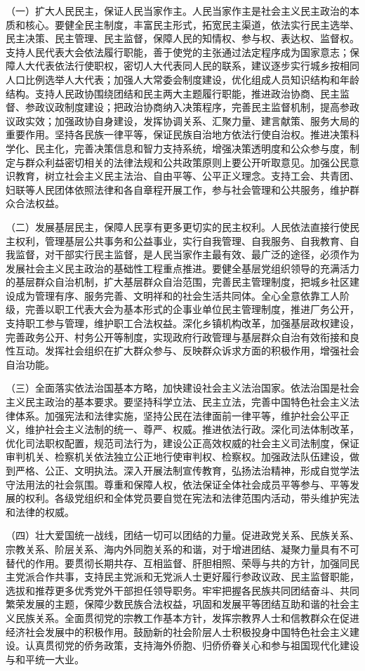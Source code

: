 （一）扩大人民民主，保证人民当家作主。人民当家作主是社会主义民主政治的本质和核心。要健全民主制度，丰富民主形式，拓宽民主渠道，依法实行民主选举、民主决策、民主管理、民主监督，保障人民的知情权、参与权、表达权、监督权。支持人民代表大会依法履行职能，善于使党的主张通过法定程序成为国家意志；保障人大代表依法行使职权，密切人大代表同人民的联系，建议逐步实行城乡按相同人口比例选举人大代表；加强人大常委会制度建设，优化组成人员知识结构和年龄结构。支持人民政协围绕团结和民主两大主题履行职能，推进政治协商、民主监督、参政议政制度建设；把政治协商纳入决策程序，完善民主监督机制，提高参政议政实效；加强政协自身建设，发挥协调关系、汇聚力量、建言献策、服务大局的重要作用。坚持各民族一律平等，保证民族自治地方依法行使自治权。推进决策科学化、民主化，完善决策信息和智力支持系统，增强决策透明度和公众参与度，制定与群众利益密切相关的法律法规和公共政策原则上要公开听取意见。加强公民意识教育，树立社会主义民主法治、自由平等、公平正义理念。支持工会、共青团、妇联等人民团体依照法律和各自章程开展工作，参与社会管理和公共服务，维护群众合法权益。

（二）发展基层民主，保障人民享有更多更切实的民主权利。人民依法直接行使民主权利，管理基层公共事务和公益事业，实行自我管理、自我服务、自我教育、自我监督，对干部实行民主监督，是人民当家作主最有效、最广泛的途径，必须作为发展社会主义民主政治的基础性工程重点推进。要健全基层党组织领导的充满活力的基层群众自治机制，扩大基层群众自治范围，完善民主管理制度，把城乡社区建设成为管理有序、服务完善、文明祥和的社会生活共同体。全心全意依靠工人阶级，完善以职工代表大会为基本形式的企事业单位民主管理制度，推进厂务公开，支持职工参与管理，维护职工合法权益。深化乡镇机构改革，加强基层政权建设，完善政务公开、村务公开等制度，实现政府行政管理与基层群众自治有效衔接和良性互动。发挥社会组织在扩大群众参与、反映群众诉求方面的积极作用，增强社会自治功能。

（三）全面落实依法治国基本方略，加快建设社会主义法治国家。依法治国是社会主义民主政治的基本要求。要坚持科学立法、民主立法，完善中国特色社会主义法律体系。加强宪法和法律实施，坚持公民在法律面前一律平等，维护社会公平正义，维护社会主义法制的统一、尊严、权威。推进依法行政。深化司法体制改革，优化司法职权配置，规范司法行为，建设公正高效权威的社会主义司法制度，保证审判机关、检察机关依法独立公正地行使审判权、检察权。加强政法队伍建设，做到严格、公正、文明执法。深入开展法制宣传教育，弘扬法治精神，形成自觉学法守法用法的社会氛围。尊重和保障人权，依法保证全体社会成员平等参与、平等发展的权利。各级党组织和全体党员要自觉在宪法和法律范围内活动，带头维护宪法和法律的权威。

（四）壮大爱国统一战线，团结一切可以团结的力量。促进政党关系、民族关系、宗教关系、阶层关系、海内外同胞关系的和谐，对于增进团结、凝聚力量具有不可替代的作用。要贯彻长期共存、互相监督、肝胆相照、荣辱与共的方针，加强同民主党派合作共事，支持民主党派和无党派人士更好履行参政议政、民主监督职能，选拔和推荐更多优秀党外干部担任领导职务。牢牢把握各民族共同团结奋斗、共同繁荣发展的主题，保障少数民族合法权益，巩固和发展平等团结互助和谐的社会主义民族关系。全面贯彻党的宗教工作基本方针，发挥宗教界人士和信教群众在促进经济社会发展中的积极作用。鼓励新的社会阶层人士积极投身中国特色社会主义建设。认真贯彻党的侨务政策，支持海外侨胞、归侨侨眷关心和参与祖国现代化建设与和平统一大业。

